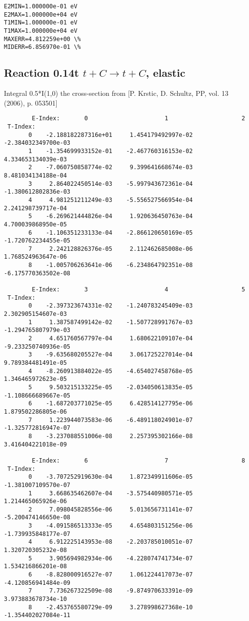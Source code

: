 \documentclass[12pt,dvipdfmx]{article}
\begin{document}
{\begin{small}
\begin{verbatim}
E2MIN=1.000000e-01 eV
E2MAX=1.000000e+04 eV
T1MIN=1.000000e-01 eV
T1MAX=1.000000e+04 eV
MAXERR=4.812259e+00 \%
MIDERR=6.856970e-01 \%
\end{verbatim}\end{small}
\newpage

\subsection{
Reaction 0.14t  $t + C \rightarrow t + C$, elastic}

Integral 0.5*I(1,0) the cross-section from [P. Krstic, D. Schultz, PP, vol. 13 (2006), p. 053501]

\begin{small}\begin{verbatim}
        E-Index:       0                      1                     2
 T-Index:
       0    -2.188182287316e+01     1.454179492997e-02    -2.384032349700e-03
       1    -1.354699933152e-01    -2.467760316153e-02     4.334653134039e-03
       2    -7.060750858774e-02     9.399641668674e-03     8.481034134188e-04
       3     2.864022450514e-03    -5.997943672361e-04    -1.380612802836e-03
       4     4.981251211249e-03    -5.556527566954e-04     2.241298739717e-04
       5    -6.269621444826e-04     1.920636450763e-04     4.700039868950e-05
       6    -1.106351233133e-04    -2.866120650169e-05    -1.720762234455e-05
       7     2.242128826376e-05     2.112462685008e-06     1.768524963647e-06
       8    -1.005706263641e-06    -6.234864792351e-08    -6.175770363502e-08

        E-Index:       3                      4                     5
 T-Index:
       0    -2.397323674331e-02    -1.240783245409e-03     2.302905154607e-03
       1     1.387587499142e-02    -1.507728991767e-03    -1.294765807979e-03
       2     4.651760567797e-04     1.680622109107e-04    -9.233250740936e-05
       3    -9.635680205527e-04     3.061725227014e-04     9.789384481491e-05
       4    -8.260913884022e-05    -4.654027458768e-05     1.346465972623e-05
       5     9.503215133225e-05    -2.034050613835e-05    -1.108666689667e-05
       6    -1.687203771025e-05     6.428514127795e-06     1.879502286805e-06
       7     1.223944073583e-06    -6.489118024901e-07    -1.325772816947e-07
       8    -3.237088551006e-08     2.257395302166e-08     3.416404221018e-09

        E-Index:       6                      7                     8
 T-Index:
       0    -3.707252919630e-04     1.872349911606e-05    -1.381007109570e-07
       1     3.668635462607e-04    -3.575440980571e-05     1.214465065926e-06
       2     7.098045828556e-06     5.013656731141e-07    -5.200474146650e-08
       3    -4.091586513333e-05     4.654803151256e-06    -1.739935848177e-07
       4     6.912225143953e-08    -2.203785010051e-07     1.320720305232e-08
       5     3.905694982934e-06    -4.228074741734e-07     1.534216866201e-08
       6    -8.828000916527e-07     1.061224417073e-07    -4.120856941484e-09
       7     7.736267322509e-08    -9.874970633391e-09     3.973883678734e-10
       8    -2.453765580729e-09     3.278998627368e-10    -1.354402027084e-11


\end{verbatim}
\end{small}}
\end{document}
